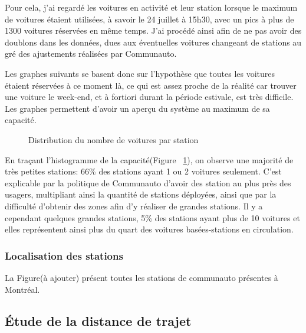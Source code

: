 \documentclass[12pt,a4paper]{article}
\newcommand{\1}[1]{\mathbbm{1}_{\{#1\}} }
\theoremstyle{definition}
\begin{document}
{Pour cela, j'ai regardé les voitures en activité et leur station lorsque le maximum de voitures étaient utilisées, à savoir le 24 juillet à 15h30, avec un pics à plus de 1300 voitures réservées en même temps. J'ai procédé ainsi afin de ne pas avoir des doublons dans les données, dues aux éventuelles voitures changeant de stations au gré des ajustements réalisées par Communauto.

Les graphes suivants se basent donc sur l'hypothèse que toutes les voitures étaient réservées à ce moment là, ce qui est assez proche de la réalité car trouver une voiture le week-end, et à fortiori durant la période estivale, est très difficile.
Les graphes permettent d'avoir un aperçu du système au maximum de sa capacité.


\begin{figure}[!h]
\centering
{}
\caption{Distribution du nombre de voitures par station}
\label{hist_capa}
\end{figure}


En traçant l'histogramme de la capacité(Figure~ \ref{hist_capa}), on observe une majorité de très petites stations: 66\% des stations ayant 1 ou 2 voitures seulement. C'est explicable par la politique de Communauto d'avoir des station au plus près des usagers, multipliant ainsi la quantité de stations déployées, ainsi que par la difficulté d'obtenir des zones afin d'y réaliser de grandes stations.
Il y a cependant quelques grandes stations, 5\% des stations ayant plus de 10 voitures et elles représentent ainsi plus du quart des voitures basées-stations en circulation.

\subsubsection{Localisation des stations}

La Figure(à ajouter) présent toutes les stations de communauto présentes à Montréal.

\subsection{Étude de la distance de trajet}


}
\end{document}
